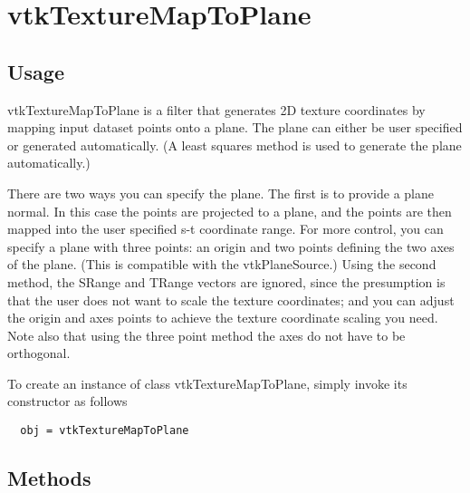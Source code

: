 \section{vtkTextureMapToPlane}

\subsection{Usage}

 vtkTextureMapToPlane is a filter that generates 2D texture coordinates
 by mapping input dataset points onto a plane. The plane can either be
 user specified or generated automatically. (A least squares method is
 used to generate the plane automatically.)

 There are two ways you can specify the plane. The first is to provide a
 plane normal. In this case the points are projected to a plane, and the
 points are then mapped into the user specified s-t coordinate range. For
 more control, you can specify a plane with three points: an origin and two
 points defining the two axes of the plane. (This is compatible with the
 vtkPlaneSource.) Using the second method, the SRange and TRange vectors
 are ignored, since the presumption is that the user does not want to scale
 the texture coordinates; and you can adjust the origin and axes points to
 achieve the texture coordinate scaling you need. Note also that using the
 three point method the axes do not have to be orthogonal.

To create an instance of class vtkTextureMapToPlane, simply
invoke its constructor as follows
\begin{verbatim}
  obj = vtkTextureMapToPlane
\end{verbatim}
\subsection{Methods}

